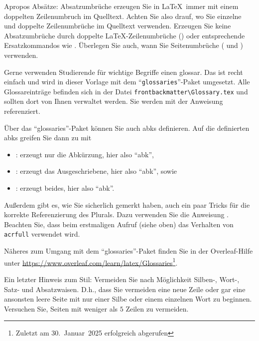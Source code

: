Apropos Absätze: {\color{red}Absatzumbrüche erzeugen Sie in \LaTeX\ immer mit einem doppelten Zeilenumbruch im Quelltext.} Achten Sie also drauf, wo Sie einzelne und doppelte Zeilenumbrüche im Quelltext verwenden. Erzeugen Sie keine Absatzumbrüche durch doppelte \LaTeX{}-Zeilenumbrüche (\inlinecode{\textbackslash\textbackslash\textbackslash\textbackslash}) oder entsprechende Ersatzkommandos wie . Überlegen Sie auch, wann Sie Seitenumbrüche ( und ) verwenden.

Gerne verwenden Studierende für wichtige Begriffe einen \Gls{glossar}. Das ist recht einfach und wird in dieser Vorlage mit dem \enquote{\texttt{glossaries}}-Paket umgesetzt. Alle Glossareinträge befinden sich in der Datei \texttt{frontbackmatter\textbackslash Glossary.tex} und sollten dort von Ihnen verwaltet werden. Sie werden mit der Anweisung  referenziert.

Über das \enquote{glossaries}-Paket können Sie auch \Glspl{abk} definieren. Auf die definierten \Glspl{abk} greifen Sie dann zu mit
\begin{itemize}
    \item {}: erzeugt nur die Abkürzung, hier also \enquote{\acrshort{abk}},
    \item {}: erzeugt das Ausgeschriebene, hier also \enquote{\acrlong{abk}}, sowie
    \item {}: erzeugt beides, hier also \enquote{\acrfull{abk}}.
\end{itemize}

Außerdem gibt es, wie Sie sicherlich gemerkt haben, auch ein paar Tricks für die korrekte Referenzierung des Plurals. Dazu verwenden Sie die Anweisung . Beachten Sie, dass beim erstmaligen Aufruf (siehe oben) das Verhalten von \texttt{acrfull} verwendet wird.

Näheres zum Umgang mit dem \enquote{glossaries}-Paket finden Sie in der Overleaf-Hilfe unter \url{https://www.overleaf.com/learn/latex/Glossaries}\footnote{Zuletzt am 30.~Januar~2025 erfolgreich abgerufen}.

Ein letzter Hinweis zum Stil: Vermeiden Sie nach Möglichkeit Silben-, Wort-, Satz- und Absatzwaisen. D.h., dass Sie vermeiden eine neue Zeile oder gar eine ansonsten leere Seite mit nur einer Silbe oder einem einzelnen Wort zu beginnen. Versuchen Sie, Seiten mit weniger als $5$ Zeilen zu vermeiden.

